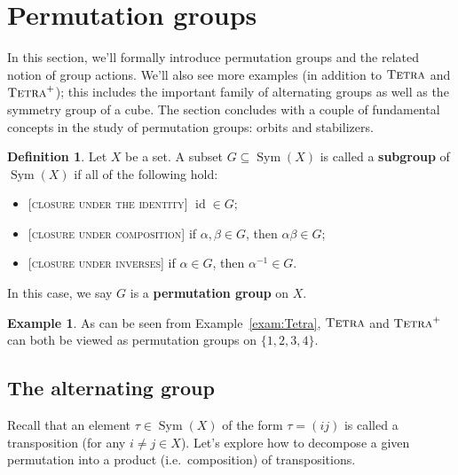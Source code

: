 \documentclass[11pt]{amsart}
\theoremstyle{plain}
\theoremstyle{definition}
\newtheorem*{definition*}{Definition}
\newtheorem{example}{Example}
\theoremstyle{remark}
\DeclareMathOperator{\Sym}{Sym}
\newcommand{\symtetra}{\textsc{Tetra}}
\newcommand{\rsymtetra}{\textsc{Tetra}^+}
\DeclareMathOperator{\id}{id}
\begin{document}
\section{Permutation groups}\label{S:permgroups}

In this section, we'll formally introduce permutation groups and the related notion of group actions. We'll also see more examples (in addition to $\symtetra$ and $\rsymtetra$); this includes the important family of alternating groups as well as the symmetry group of a cube. The section concludes with a couple of fundamental concepts in the study of permutation groups: orbits and stabilizers.

\begin{definition*}
Let $X$ be a set. A subset $G \subseteq \Sym(X)$ is called a \textbf{subgroup} of $\Sym(X)$ if all of the following hold:
\begin{itemize}
\item{} [\textsc{closure under the identity}] $\id \in G$;
\item{} [\textsc{closure under composition}] if $\alpha,\beta \in G$, then $\alpha\beta \in G$;
\item{} [\textsc{closure under inverses}] if $\alpha \in G$, then $\alpha^{-1} \in G$.
\end{itemize}
In this case, we say $G$ is a \textbf{permutation group} on $X$.
\end{definition*}

\begin{example}
As can be seen from Example~\ref{exam:Tetra}, $\symtetra$ and $\rsymtetra$ can both be viewed as permutation groups on $\{1,2,3,4\}$.
\end{example}


\subsection{The alternating group}

Recall that an element $\tau \in \Sym(X)$ of the form $\tau = (ij)$  is called a transposition (for any $i\neq j \in X$). Let's explore how to decompose a given permutation into a product (i.e.~composition) of transpositions.
\end{document}
